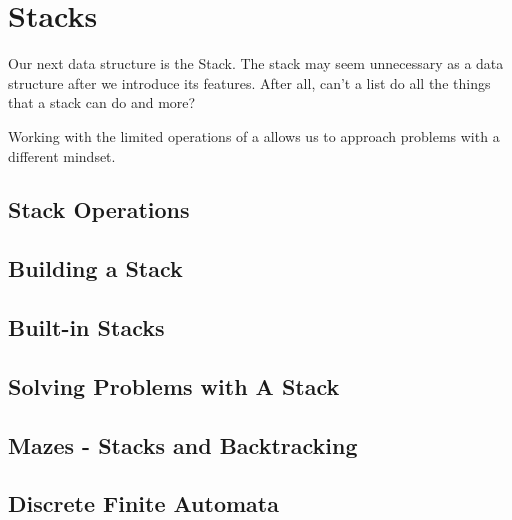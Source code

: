 \chapter{Stacks}
Our next data structure is the Stack.
The stack may seem unnecessary as a data structure after we introduce its features.  
After all, can't a list do all the things that a stack can do and more? 

Working with the limited operations of a allows us to approach problems with a different mindset.

\section{Stack Operations}


\section{Building a Stack}


\section{Built-in Stacks}

\section{Solving Problems with A Stack}


\section{Mazes - Stacks and Backtracking}



\section{Discrete Finite Automata}
